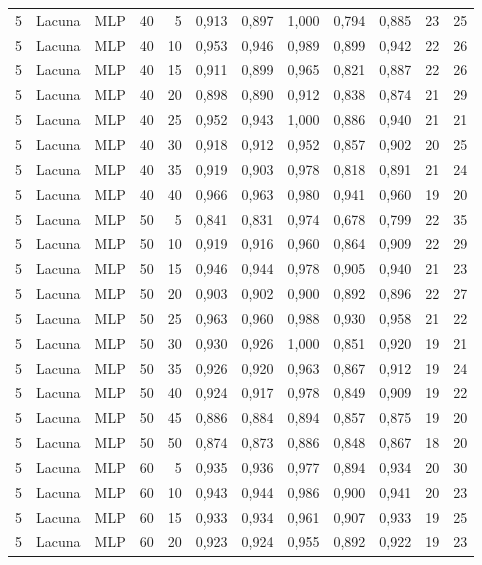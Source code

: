 \begin{longtable}{@{}rllrrrrrrrrr@{}}
5 & Lacuna & MLP & 40 & 5 & 0,913 & 0,897 & 1,000 & 0,794 & 0,885 & 23 & 25 \\
5 & Lacuna & MLP & 40 & 10 & 0,953 & 0,946 & 0,989 & 0,899 & 0,942 & 22 & 26 \\
5 & Lacuna & MLP & 40 & 15 & 0,911 & 0,899 & 0,965 & 0,821 & 0,887 & 22 & 26 \\
5 & Lacuna & MLP & 40 & 20 & 0,898 & 0,890 & 0,912 & 0,838 & 0,874 & 21 & 29 \\
5 & Lacuna & MLP & 40 & 25 & 0,952 & 0,943 & 1,000 & 0,886 & 0,940 & 21 & 21 \\
5 & Lacuna & MLP & 40 & 30 & 0,918 & 0,912 & 0,952 & 0,857 & 0,902 & 20 & 25 \\
5 & Lacuna & MLP & 40 & 35 & 0,919 & 0,903 & 0,978 & 0,818 & 0,891 & 21 & 24 \\
5 & Lacuna & MLP & 40 & 40 & 0,966 & 0,963 & 0,980 & 0,941 & 0,960 & 19 & 20 \\
5 & Lacuna & MLP & 50 & 5 & 0,841 & 0,831 & 0,974 & 0,678 & 0,799 & 22 & 35 \\
5 & Lacuna & MLP & 50 & 10 & 0,919 & 0,916 & 0,960 & 0,864 & 0,909 & 22 & 29 \\
5 & Lacuna & MLP & 50 & 15 & 0,946 & 0,944 & 0,978 & 0,905 & 0,940 & 21 & 23 \\
5 & Lacuna & MLP & 50 & 20 & 0,903 & 0,902 & 0,900 & 0,892 & 0,896 & 22 & 27 \\
5 & Lacuna & MLP & 50 & 25 & 0,963 & 0,960 & 0,988 & 0,930 & 0,958 & 21 & 22 \\
5 & Lacuna & MLP & 50 & 30 & 0,930 & 0,926 & 1,000 & 0,851 & 0,920 & 19 & 21 \\
5 & Lacuna & MLP & 50 & 35 & 0,926 & 0,920 & 0,963 & 0,867 & 0,912 & 19 & 24 \\
5 & Lacuna & MLP & 50 & 40 & 0,924 & 0,917 & 0,978 & 0,849 & 0,909 & 19 & 22 \\
5 & Lacuna & MLP & 50 & 45 & 0,886 & 0,884 & 0,894 & 0,857 & 0,875 & 19 & 20 \\
5 & Lacuna & MLP & 50 & 50 & 0,874 & 0,873 & 0,886 & 0,848 & 0,867 & 18 & 20 \\
5 & Lacuna & MLP & 60 & 5 & 0,935 & 0,936 & 0,977 & 0,894 & 0,934 & 20 & 30 \\
5 & Lacuna & MLP & 60 & 10 & 0,943 & 0,944 & 0,986 & 0,900 & 0,941 & 20 & 23 \\
5 & Lacuna & MLP & 60 & 15 & 0,933 & 0,934 & 0,961 & 0,907 & 0,933 & 19 & 25 \\
5 & Lacuna & MLP & 60 & 20 & 0,923 & 0,924 & 0,955 & 0,892 & 0,922 & 19 & 23 \\

\end{longtable}
